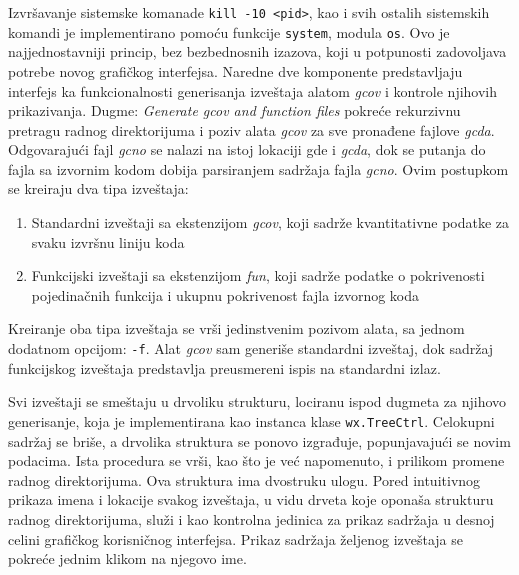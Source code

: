 \documentclass[12pt,oneside]{memoir}
\newcommand{\kod}[1]{\texttt{#1}}
\newcommand{\strano}[1]{\textit{#1}}
\begin{document}
Izvršavanje sistemske komanade \kod{kill -10 <pid>}, kao i svih ostalih sistemskih komandi je implementirano pomoću funkcije \kod{system}, modula \kod{os}. Ovo je najjednostavniji princip, bez bezbednosnih izazova, koji u potpunosti zadovoljava potrebe novog grafičkog interfejsa. Naredne dve komponente predstavljaju interfejs ka funkcionalnosti generisanja izveštaja alatom \strano{gcov} i kontrole njihovih prikazivanja. Dugme: \strano{Generate gcov and function files} pokreće rekurzivnu pretragu radnog direktorijuma i poziv alata \strano{gcov} za sve pronađene fajlove \strano{gcda}. Odgovarajući fajl \strano{gcno} se nalazi na istoj lokaciji gde i \strano{gcda}, dok se putanja do fajla sa izvornim kodom dobija parsiranjem sadržaja fajla \strano{gcno}. Ovim postupkom se kreiraju dva tipa izveštaja: 
\begin{enumerate}
\item Standardni izveštaji sa ekstenzijom \strano{gcov}, koji sadrže kvantitativne podatke za svaku izvršnu liniju koda
\item Funkcijski izveštaji sa ekstenzijom \strano{fun}, koji sadrže podatke o pokrivenosti pojedinačnih funkcija i ukupnu pokrivenost fajla izvornog koda
\end{enumerate}
Kreiranje oba tipa izveštaja se vrši jedinstvenim pozivom alata, sa jednom dodatnom opcijom: \kod{-f}. Alat \strano{gcov} sam generiše standardni izveštaj, dok sadržaj funkcijskog izveštaja predstavlja preusmereni ispis na standardni izlaz. 

Svi izveštaji se smeštaju u drvoliku strukturu, lociranu ispod dugmeta za njihovo generisanje, koja je implementirana kao instanca klase \kod{wx.TreeCtrl}. Celokupni sadržaj se briše, a drvolika struktura se ponovo izgrađuje, popunjavajući se novim podacima. Ista procedura se vrši, kao što je već napomenuto, i prilikom promene radnog direktorijuma. Ova struktura ima dvostruku ulogu. Pored intuitivnog prikaza imena i lokacije svakog izveštaja, u vidu drveta koje oponaša strukturu radnog direktorijuma, služi i kao kontrolna jedinica za prikaz sadržaja u desnoj celini grafičkog korisničnog interfejsa. Prikaz sadržaja željenog izveštaja se pokreće jednim klikom na njegovo ime. 
\end{document}
